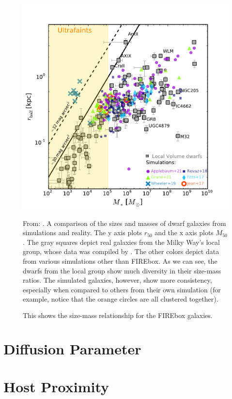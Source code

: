 \begin{figure}
    \includegraphics*[width=\textwidth]{figs/sales/fig4.pdf}
    \label{fig:sales-size-mass}
    \caption{
        From: \cite{salesBaryonicSolutionsChallenges2022}. A comparison of the sizes and masses of dwarf galaxies from simulations and reality. The y axis plots $r_{50}$ and the x axis plots $M_{50}$. The gray squares depict real galaxies from the Milky Way's local group, whose data was compiled by \cite{mcconnachieOBSERVEDPROPERTIESDWARF2012}. The other colors depict data from various simulations other than FIREbox. As we can see, the dwarfs from the local group show much diversity in their size-mass ratios. The simulated galaxies, however, show more consistency, especially when compared to others from their own simulation (for example, notice that the orange circles are all clustered together).
    }
\end{figure}

\begin{figure}
    \centering
    
    \caption{This shows the size-mass relationship for the FIREbox galaxies. }
\end{figure}

\section{Diffusion Parameter}

\section{Host Proximity}


